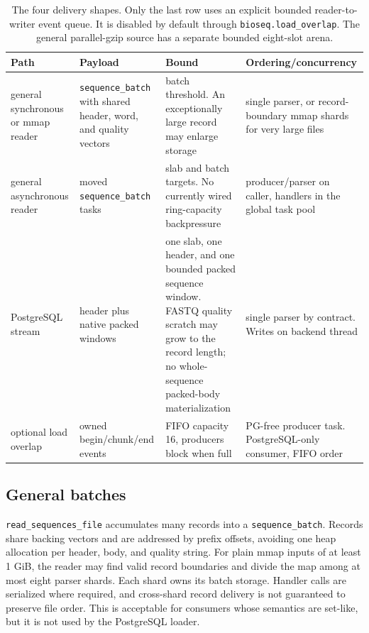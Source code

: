 \begin{table}[htbp]
\centering
\footnotesize
\setlength{\tabcolsep}{3pt}
\renewcommand{\arraystretch}{1.08}
\begin{tabular}{
  >{\raggedright\arraybackslash}p{}
  >{\raggedright\arraybackslash}p{}
  >{\raggedright\arraybackslash}p{}
  >{\raggedright\arraybackslash}p{}}
\toprule
\textbf{Path} & \textbf{Payload} & \textbf{Bound} & \textbf{Ordering/concurrency}\\
\midrule
general synchronous or mmap reader &
\texttt{sequence\_batch} with shared header, word, and quality vectors &
batch threshold. An exceptionally large record may enlarge storage &
single parser, or record-boundary mmap shards for very large files\\
general asynchronous reader &
moved \texttt{sequence\_batch} tasks &
slab and batch targets. No currently wired ring-capacity backpressure &
producer/parser on caller, handlers in the global task pool\\
PostgreSQL stream &
header plus native packed windows &
one slab, one header, and one bounded packed sequence window. FASTQ quality
scratch may grow to the record length; no whole-sequence packed-body
materialization &
single parser by contract. Writes on backend thread\\
optional load overlap &
owned begin/chunk/end events &
FIFO capacity 16, producers block when full &
PG-free producer task. PostgreSQL-only consumer, FIFO order\\
\bottomrule
\end{tabular}
\caption{The four delivery shapes. Only the last row uses an explicit bounded
reader-to-writer event queue. It is disabled by default through
\texttt{bioseq.load\_overlap}. The general
parallel-gzip source has a separate bounded eight-slot arena.}
\label{tab:io-delivery-shapes}
\end{table}

\subsection{General batches}

\texttt{read\_sequences\_file} accumulates many records into a
\texttt{sequence\_batch}.  Records share backing vectors and are addressed by
prefix offsets, avoiding one heap allocation per header, body, and quality
string.  For plain mmap inputs of at least 1 GiB, the reader may find valid
record boundaries and divide the map among at most eight parser shards.  Each
shard owns its batch storage. Handler calls are serialized where required, and
cross-shard record delivery is not guaranteed to preserve file order.  This is
acceptable for consumers whose semantics are set-like, but it is not used by
the PostgreSQL loader.

